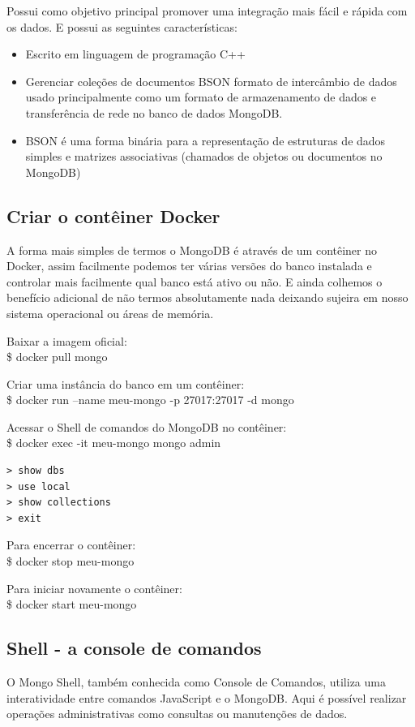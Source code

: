 \documentclass[a4paper,11pt]{article}
\begin{document}
Possui como objetivo principal promover uma integração mais fácil e rápida com os dados. E possui as seguintes características:
\begin{itemize}[nolistsep]
  \item Escrito em linguagem de programação C++
  \item Gerenciar coleções de documentos BSON formato de intercâmbio de dados usado principalmente como um formato de armazenamento de dados e transferência de rede no banco de dados MongoDB.
  \item BSON é uma forma binária para a representação de estruturas de dados simples e matrizes associativas (chamados de objetos ou documentos no MongoDB)
\end{itemize}

\subsection{Criar o contêiner Docker}
A forma mais simples de termos o MongoDB é através de um contêiner no Docker, assim facilmente podemos ter várias versões do banco instalada e controlar mais facilmente qual banco está ativo ou não. E ainda colhemos o benefício adicional de não termos absolutamente nada deixando sujeira em nosso sistema operacional ou áreas de memória.

Baixar a imagem oficial: \\
{\ttfamily\$ docker pull mongo}

Criar uma instância do banco em um contêiner: \\
{\ttfamily\$ docker run --name meu-mongo -p 27017:27017 -d mongo}

Acessar o Shell de comandos do MongoDB no contêiner: \\
{\ttfamily\$ docker exec -it meu-mongo mongo admin}
\begin{lstlisting}
> show dbs
> use local
> show collections
> exit
\end{lstlisting}

Para encerrar o contêiner: \\
{\ttfamily\$ docker stop meu-mongo} 

Para iniciar novamente o contêiner: \\
{\ttfamily\$ docker start meu-mongo} 

\subsection{Shell - a console de comandos}
O Mongo Shell, também conhecida como Console de Comandos, utiliza uma interatividade entre comandos JavaScript e o MongoDB. Aqui é possível realizar operações administrativas como consultas ou manutenções de dados.
\end{document}
